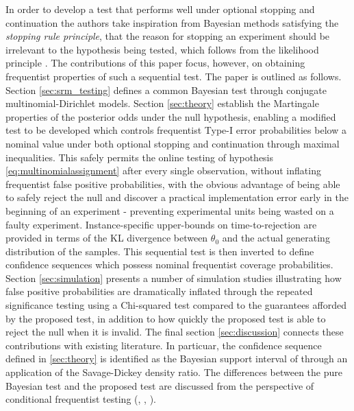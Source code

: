 \documentclass[11pt]{article}
\begin{document}
In order to develop a test that performs well under optional stopping and continuation the authors take inspiration from Bayesian methods satisfying the \textit{stopping rule principle}, that the reason for stopping an experiment should be irrelevant to the hypothesis being tested, which follows from the likelihood principle \cite{likelihood}. The contributions of this paper focus, however, on obtaining frequentist properties of such a sequential test.
The paper is outlined as follows. Section \ref{sec:srm_testing} defines a common Bayesian test through conjugate multinomial-Dirichlet models. Section \ref{sec:theory} establish the Martingale properties of the posterior odds under the null hypothesis, enabling a modified test to be developed which controls frequentist Type-I error probabilities below a nominal value under both optional stopping and continuation through maximal inequalities.  This safely permits the online testing of hypothesis \eqref{eq:multinomialassignment} after every single observation, without inflating frequentist false positive probabilities, with the obvious advantage of being able to safely reject the null and discover a practical implementation error early in the beginning of an experiment - preventing experimental units being wasted on a faulty experiment. Instance-specific upper-bounds on time-to-rejection are provided in terms of the KL divergence  between $\theta_0$ and the actual generating distribution of the samples. This sequential test is then inverted to define confidence sequences which possess nominal frequentist coverage probabilities. Section \ref{sec:simulation} presents a number of simulation studies illustrating how false positive probabilities are dramatically inflated through the repeated significance testing using a Chi-squared test compared to the guarantees afforded by the proposed test, in addition to how quickly the proposed test is able to reject the null when it is invalid. The final section \ref{sec:discussion} connects these contributions with existing literature. In particuar, the confidence sequence defined in \ref{sec:theory} is identified as the Bayesian support interval of \cite{support_interval} through an application of the Savage-Dickey density ratio. The differences between the pure Bayesian test and the proposed test are discussed from the perspective of conditional frequentist testing (\cite{conditional_frequentist_simple}, \cite{conditional_frequentist_precise}, \cite{conditional_frequentist_composite}).




\end{document}
